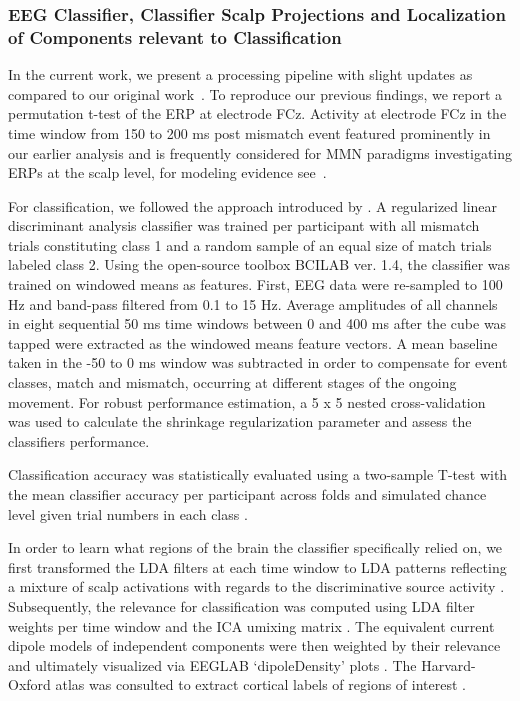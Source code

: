 \subsubsection{EEG Classifier, Classifier Scalp Projections and Localization of Components relevant to Classification}

In the current work, we present a processing pipeline with slight updates as compared to our original work~\cite{Gehrke2019-og}. To reproduce our previous findings, we report a permutation t-test of the ERP at electrode FCz. Activity at electrode FCz in the time window from 150 to 200 ms post mismatch event featured prominently in our earlier analysis and is frequently considered for MMN paradigms investigating ERPs at the scalp level, for modeling evidence see~\cite{Lieder2013-dl, Lieder2013-os}.

For classification, we followed the approach introduced by \cite{Zander2016-ed}. A regularized linear discriminant analysis classifier was trained per participant with all mismatch trials constituting class 1 and a random sample of an equal size of match trials labeled class 2. Using the open-source toolbox BCILAB ver. 1.4, the classifier was trained on windowed means as features. First, EEG data were re-sampled to 100 Hz and band-pass filtered from 0.1 to 15 Hz. Average amplitudes of all channels in eight sequential 50 ms time windows between 0 and 400 ms after the cube was tapped were extracted as the windowed means feature vectors. A mean baseline taken in the -50 to 0 ms window was subtracted in order to compensate for event classes, match and mismatch, occurring at different stages of the ongoing movement. For robust performance estimation, a 5 x 5 nested cross-validation was used to calculate the shrinkage regularization parameter and assess the classifiers performance.

Classification accuracy was statistically evaluated using a two-sample T-test with the mean classifier accuracy per participant across folds and simulated chance level given trial numbers in each class \cite{Muller-Putz2007-oc}.

In order to learn what regions of the brain the classifier specifically relied on, we first transformed the LDA filters at each time window to LDA patterns reflecting a mixture of scalp activations with regards to the discriminative source activity \cite{Haufe2014-do}. Subsequently, the relevance for classification was computed using LDA filter weights per time window and the ICA umixing matrix \cite{Zander2016-ed}. The equivalent current dipole models of independent components were then weighted by their relevance and ultimately visualized via EEGLAB `dipoleDensity' plots \cite{Krol2018-cw}. The Harvard-Oxford atlas was consulted to extract cortical labels of regions of interest \cite{Makris2006-kp}.


